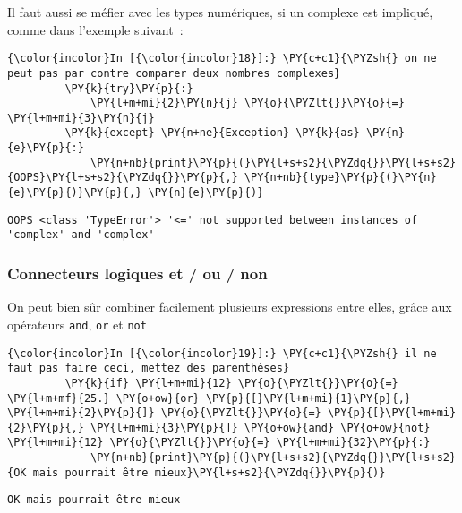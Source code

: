 Il faut aussi se méfier avec les types numériques, si un complexe est
impliqué, comme dans l'exemple suivant~:

    \begin{Verbatim}[commandchars=\\\{\}]
{\color{incolor}In [{\color{incolor}18}]:} \PY{c+c1}{\PYZsh{} on ne peut pas par contre comparer deux nombres complexes}
         \PY{k}{try}\PY{p}{:}
             \PY{l+m+mi}{2}\PY{n}{j} \PY{o}{\PYZlt{}}\PY{o}{=} \PY{l+m+mi}{3}\PY{n}{j}
         \PY{k}{except} \PY{n+ne}{Exception} \PY{k}{as} \PY{n}{e}\PY{p}{:}
             \PY{n+nb}{print}\PY{p}{(}\PY{l+s+s2}{\PYZdq{}}\PY{l+s+s2}{OOPS}\PY{l+s+s2}{\PYZdq{}}\PY{p}{,} \PY{n+nb}{type}\PY{p}{(}\PY{n}{e}\PY{p}{)}\PY{p}{,} \PY{n}{e}\PY{p}{)}
\end{Verbatim}


    \begin{Verbatim}[commandchars=\\\{\}]
OOPS <class 'TypeError'> '<=' not supported between instances of 'complex' and 'complex'

    \end{Verbatim}

    \hypertarget{connecteurs-logiques-et-ou-non}{%
\subsubsection{Connecteurs logiques et / ou /
non}\label{connecteurs-logiques-et-ou-non}}

    On peut bien sûr combiner facilement plusieurs expressions entre elles,
grâce aux opérateurs \texttt{and}, \texttt{or} et \texttt{not}

    \begin{Verbatim}[commandchars=\\\{\}]
{\color{incolor}In [{\color{incolor}19}]:} \PY{c+c1}{\PYZsh{} il ne faut pas faire ceci, mettez des parenthèses}
         \PY{k}{if} \PY{l+m+mi}{12} \PY{o}{\PYZlt{}}\PY{o}{=} \PY{l+m+mf}{25.} \PY{o+ow}{or} \PY{p}{[}\PY{l+m+mi}{1}\PY{p}{,} \PY{l+m+mi}{2}\PY{p}{]} \PY{o}{\PYZlt{}}\PY{o}{=} \PY{p}{[}\PY{l+m+mi}{2}\PY{p}{,} \PY{l+m+mi}{3}\PY{p}{]} \PY{o+ow}{and} \PY{o+ow}{not} \PY{l+m+mi}{12} \PY{o}{\PYZlt{}}\PY{o}{=} \PY{l+m+mi}{32}\PY{p}{:}
             \PY{n+nb}{print}\PY{p}{(}\PY{l+s+s2}{\PYZdq{}}\PY{l+s+s2}{OK mais pourrait être mieux}\PY{l+s+s2}{\PYZdq{}}\PY{p}{)}
\end{Verbatim}


    \begin{Verbatim}[commandchars=\\\{\}]
OK mais pourrait être mieux

    \end{Verbatim}

